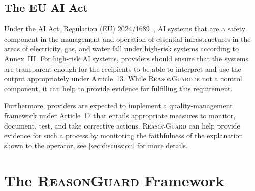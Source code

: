 \documentclass[conference]{IEEEtran}
\newcommand{\rg}{\textsc{ReasonGuard}}
\begin{document}
\subsection{The EU AI Act}
Under the AI Act, Regulation (EU) 2024/1689~\cite{EUAIAct2024}, AI systems that are a safety component in the management and operation of essential infrastructures in the areas of electricity, gas, and water fall under high-risk systems according to Annex~III. For high-risk AI systems, providers should ensure that the systems are transparent enough for the recipients to be able to interpret and use the output appropriately under Article~13. While \rg{} is not a control component, it can help to provide evidence for fulfilling this requirement.

Furthermore, providers are expected to implement a quality-management framework under Article~17 that entails appropriate measures to monitor, document, test, and take corrective actions. \rg{} can help provide evidence for such a process by monitoring the faithfulness of the explanation shown to the operator, see \cref{sec:discussion} for more details.

\section{The \rg{} Framework}\label{sec:framework}
\end{document}
